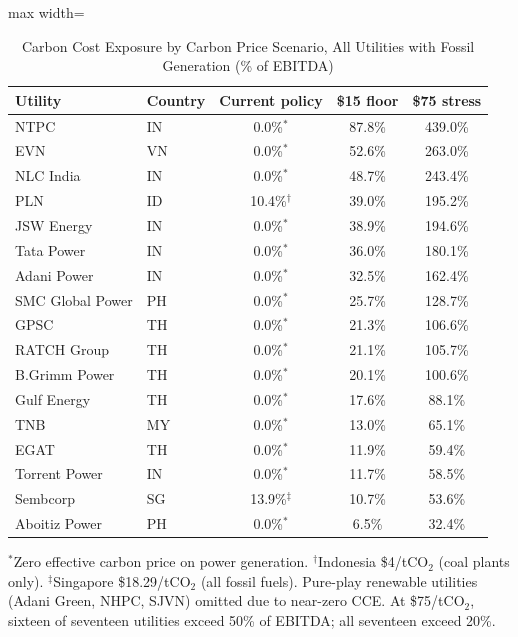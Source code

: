 \documentclass[review,3p,authoryear]{elsarticle}
\begin{document}
\begin{table}[H]
\centering
\caption{Carbon Cost Exposure by Carbon Price Scenario, All Utilities with Fossil Generation (\% of EBITDA)}
\label{tab:scenarios_full}
\begin{adjustbox}{max width=\linewidth}
\begin{tabular}{@{}llccc@{}}
\toprule
\textbf{Utility} & \textbf{Country} & \textbf{Current policy} & \textbf{\$15 floor} & \textbf{\$75 stress} \\
\midrule
NTPC & IN & 0.0\%$^{*}$ & 87.8\% & 439.0\% \\
EVN & VN & 0.0\%$^{*}$ & 52.6\% & 263.0\% \\
NLC India & IN & 0.0\%$^{*}$ & 48.7\% & 243.4\% \\
PLN & ID & 10.4\%$^{\dagger}$ & 39.0\% & 195.2\% \\
JSW Energy & IN & 0.0\%$^{*}$ & 38.9\% & 194.6\% \\
Tata Power & IN & 0.0\%$^{*}$ & 36.0\% & 180.1\% \\
Adani Power & IN & 0.0\%$^{*}$ & 32.5\% & 162.4\% \\
SMC Global Power & PH & 0.0\%$^{*}$ & 25.7\% & 128.7\% \\
GPSC & TH & 0.0\%$^{*}$ & 21.3\% & 106.6\% \\
RATCH Group & TH & 0.0\%$^{*}$ & 21.1\% & 105.7\% \\
B.Grimm Power & TH & 0.0\%$^{*}$ & 20.1\% & 100.6\% \\
Gulf Energy & TH & 0.0\%$^{*}$ & 17.6\% & 88.1\% \\
TNB & MY & 0.0\%$^{*}$ & 13.0\% & 65.1\% \\
EGAT & TH & 0.0\%$^{*}$ & 11.9\% & 59.4\% \\
Torrent Power & IN & 0.0\%$^{*}$ & 11.7\% & 58.5\% \\
Sembcorp & SG & 13.9\%$^{\ddagger}$ & 10.7\% & 53.6\% \\
Aboitiz Power & PH & 0.0\%$^{*}$ & 6.5\% & 32.4\% \\
\bottomrule
\end{tabular}
\end{adjustbox}
\begin{flushleft}
\footnotesize{$^{*}$Zero effective carbon price on power generation. $^{\dagger}$Indonesia \$4/tCO$_2$ (coal plants only). $^{\ddagger}$Singapore \$18.29/tCO$_2$ (all fossil fuels). Pure-play renewable utilities (Adani Green, NHPC, SJVN) omitted due to near-zero CCE. At \$75/tCO$_2$, sixteen of seventeen utilities exceed 50\% of EBITDA; all seventeen exceed 20\%.}
\end{flushleft}
\end{table}
\end{document}
